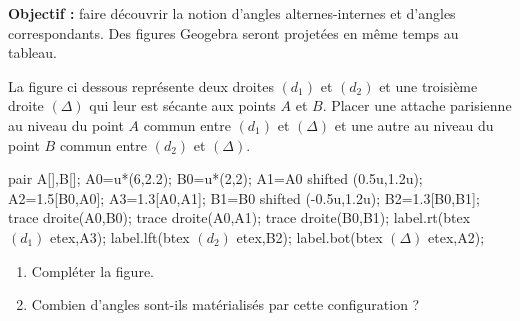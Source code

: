 \begin{activite}
   \vspace*{-10mm}    
   {\bf Objectif :} faire découvrir la notion d'angles alternes-internes et d'angles correspondants. Des figures Geogebra seront projetées en même temps au tableau.
   {\renewcommand{\baselinestretch}{1.15}\selectfont        
   \partie[préparation]
   \vspace*{-5mm}
      La figure ci dessous représente deux droites $(d_1)$ et $(d_2)$ et une troisième droite $(\Delta)$ qui leur est sécante aux points $A$ et $B$. Placer une attache parisienne au niveau du point $A$ commun entre $(d_1)$ et $(\Delta)$ et une autre au niveau du point $B$ commun entre $(d_2)$ et $(\Delta)$. 
      \par\smallskip
      \begin{minipage}{0.7\linewidth}
         \begin{center}
            \begin{Geometrie}[CoinHD={(8.5u,4u)}]
               pair A[],B[];
               A0=u*(6,2.2);
               B0=u*(2,2);
               A1=A0 shifted (0.5u,1.2u);               
               A2=1.5[B0,A0];%
               A3=1.3[A0,A1];%
               B1=B0 shifted (-0.5u,1.2u);               
               B2=1.3[B0,B1];%
               trace droite(A0,B0);
               trace droite(A0,A1);
               trace droite(B0,B1);
               label.rt(btex $(d_1)$ etex,A3);
               label.lft(btex $(d_2)$ etex,B2);
               label.bot(btex $(\Delta)$ etex,A2);
            \end{Geometrie}
      \end{center}
   \end{minipage}
   \hfill
   \begin{minipage}{0.45\linewidth}
      \begin{enumerate}
         \item Compléter la figure.
         \item Combien d'angles sont-ils matérialisés par cette configuration ?
         \par\pointilles[\linewidth]
         \par\pointilles[\linewidth]
         \par\pointilles[\linewidth]
      \end{enumerate}
   \end{minipage}
   \vspace*{-10mm}
}
\end{activite}
